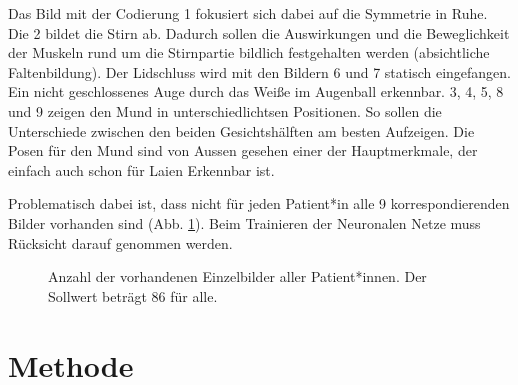 Das Bild mit der Codierung 1 fokusiert sich dabei auf die Symmetrie in Ruhe. Die 2 bildet die Stirn ab. Dadurch sollen die Auswirkungen und die Beweglichkeit der Muskeln rund um die Stirnpartie bildlich festgehalten werden (absichtliche Faltenbildung). Der Lidschluss wird mit den Bildern 6 und 7 statisch eingefangen. Ein nicht geschlossenes Auge durch das Weiße im Augenball erkennbar. 3, 4, 5, 8 und 9 zeigen den Mund in unterschiedlichtsen Positionen. So sollen die Unterschiede zwischen den beiden Gesichtshälften am besten Aufzeigen. Die Posen für den Mund sind von Aussen gesehen einer der Hauptmerkmale, der einfach auch schon für Laien Erkennbar ist.

Problematisch dabei ist, dass nicht für jeden Patient*in alle 9 korrespondierenden Bilder vorhanden sind (Abb. \ref{cap:bar_code}). Beim Trainieren der Neuronalen Netze muss Rücksicht darauf genommen werden.


\begin{figure}[!tb]\centering
{}
\caption[Anzahl der vorhandenen  Einzelbilder aller Patient*innen]{Anzahl der vorhandenen  Einzelbilder aller Patient*innen. Der Sollwert beträgt 86 für alle.}\label{cap:bar_code}
\end{figure}\label{fig:bar_code}








\clearpage
\section{Methode}\label{method}

